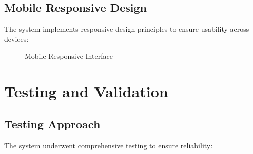 \documentclass[12pt,a4paper]{report}
\begin{document}
\section{Mobile Responsive Design}
The system implements responsive design principles to ensure usability across devices:

\begin{figure}[H]
    \centering
    \caption{Mobile Responsive Interface}
    \label{fig:mobile-interface-screenshot}
\end{figure}

\chapter{Testing and Validation}

\section{Testing Approach}
The system underwent comprehensive testing to ensure reliability:
\end{document}
